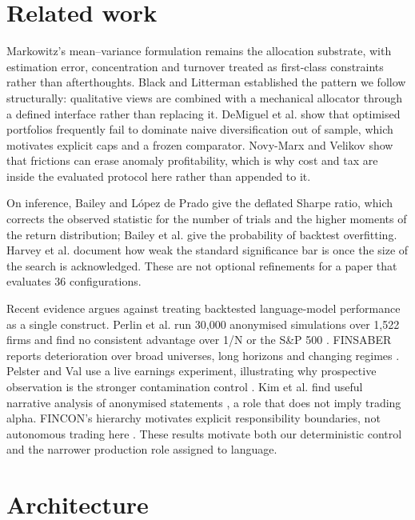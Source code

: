 \documentclass[10pt,conference]{IEEEtran}
\begin{document}
\section{Related work}

Markowitz's mean--variance formulation \cite{markowitz} remains the allocation substrate, with estimation error, concentration and turnover treated as first-class constraints rather than afterthoughts. Black and Litterman \cite{blacklitterman} established the pattern we follow structurally: qualitative views are combined with a mechanical allocator through a defined interface rather than replacing it. DeMiguel et al. \cite{demiguel} show that optimised portfolios frequently fail to dominate naive diversification out of sample, which motivates explicit caps and a frozen comparator. Novy-Marx and Velikov \cite{novymarx} show that frictions can erase anomaly profitability, which is why cost and tax are inside the evaluated protocol here rather than appended to it.

On inference, Bailey and L\'opez de Prado \cite{deflated} give the deflated Sharpe ratio, which corrects the observed statistic for the number of trials and the higher moments of the return distribution; Bailey et al. \cite{pbo} give the probability of backtest overfitting. Harvey et al. \cite{harvey} document how weak the standard significance bar is once the size of the search is acknowledged. These are not optional refinements for a paper that evaluates 36 configurations.

Recent evidence argues against treating backtested language-model performance as a single construct. Perlin et al. run 30,000 anonymised simulations over 1,522 firms and find no consistent advantage over 1/N or the S\&P 500 \cite{perlin}. FINSABER reports deterioration over broad universes, long horizons and changing regimes \cite{finsaber}. Pelster and Val use a live earnings experiment, illustrating why prospective observation is the stronger contamination control \cite{pelsterval}. Kim et al. find useful narrative analysis of anonymised statements \cite{kim}, a role that does not imply trading alpha. FINCON's hierarchy motivates explicit responsibility boundaries, not autonomous trading here \cite{fincon}. These results motivate both our deterministic control and the narrower production role assigned to language.

\section{Architecture}
\end{document}
